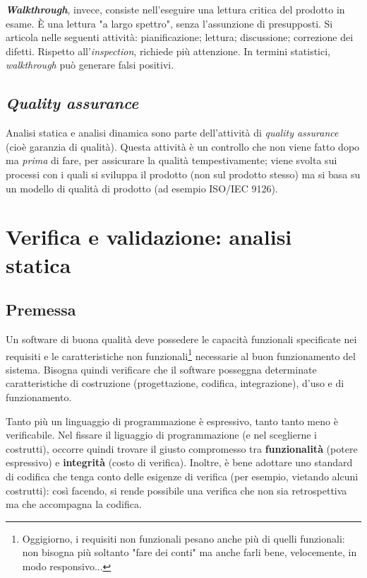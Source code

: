 \documentclass[a4paper]{article}
\begin{document}
\textbf{\emph{Walkthrough}}, invece, consiste nell'eseguire una lettura critica del prodotto in esame. È una lettura "a largo spettro", senza l'assunzione di presupposti. Si articola nelle seguenti attività: pianificazione; lettura; discussione; correzione dei difetti. Rispetto all'\emph{inspection}, richiede più attenzione. In termini statistici, \emph{walkthrough} può generare falsi positivi.

		
	\subsection{\emph{Quality assurance}}

		
Analisi statica e analisi dinamica sono parte dell'attività di \emph{quality assurance} (cioè garanzia di qualità). Questa attività è un controllo che non viene fatto dopo ma \emph{prima} di fare, per assicurare la qualità tempestivamente; viene svolta sui processi con i quali si sviluppa il prodotto (non sul prodotto stesso) ma si basa su un modello di qualità di prodotto (ad esempio ISO/IEC 9126).
	


		
	\section{Verifica e validazione: analisi statica}


		
	\subsection{Premessa}

		
Un software di buona qualità deve possedere le capacità funzionali specificate nei requisiti e le caratteristiche non funzionali\footnote{Oggigiorno, i requisiti non funzionali pesano anche più di quelli funzionali: non bisogna più soltanto "fare dei conti" ma anche farli bene, velocemente, in modo responsivo...} necessarie al buon funzionamento del sistema. Bisogna quindi verificare che il software posseggna determinate caratteristiche di costruzione (progettazione, codifica, integrazione), d'uso e di funzionamento.
		
Tanto più un linguaggio di programmazione è espressivo, tanto tanto meno è verificabile. Nel fissare il liguaggio di programmazione (e nel sceglierne i costrutti), occorre quindi trovare il giusto compromesso tra \textbf{funzionalità} (potere espressivo) e \textbf{integrità} (costo di verifica). Inoltre, è bene adottare uno standard di codifica che tenga conto delle esigenze di verifica (per esempio, vietando alcuni costrutti): così facendo, si rende possibile una verifica che non sia retrospettiva ma che accompagna la codifica.
		
\end{document}
